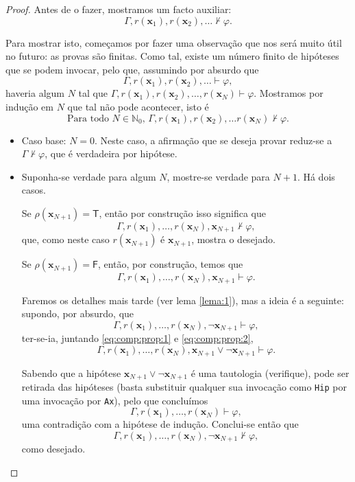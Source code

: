 \documentclass{report}
\theoremstyle{definition}
\theoremstyle{remark}
\newcommand{\N}{\mathbb{N}}
\renewcommand{\bf}[1]{\mathbf{#1}}
\newcommand{\lt}{\mathsf{T}}
\newcommand{\lf}{\mathsf{F}}
\begin{document}
\begin{proof}
	Antes de o fazer, mostramos um facto auxiliar:
	\begin{equation}\label{eq:comp:prop:-1}
	\Gamma, r(\bf x_1), r(\bf x_2), \dots \nvdash \varphi.
	\end{equation}
	
	Para mostrar isto, começamos por fazer uma observação que nos será muito útil no futuro: as provas são finitas. Como tal, existe um número finito de hipóteses que se podem invocar, pelo que, assumindo por absurdo que
	\[\Gamma, r(\bf x_1), r(\bf x_2), \dots \vdash \varphi,\]
	haveria algum $N$ tal que $\Gamma, r(\bf x_1), r(\bf x_2), \dots, r(\bf x_N) \vdash \varphi$. Mostramos por indução em $N$ que tal não pode acontecer, isto é
	\begin{equation}\label{eq:comp:prop:0}
	\text{Para todo $N \in \N_0$, } \Gamma, r(\bf x_1), r(\bf x_2), \dots r(\bf x_N) \nvdash \varphi.
	\end{equation}
	
	\begin{itemize}
	\item Caso base: $N = 0$. Neste caso, a afirmação que se deseja provar reduz-se a $\Gamma \nvdash \varphi$, que é verdadeira por hipótese.
	
	\item Suponha-se verdade para algum $N$, mostre-se verdade para $N+1$. Há dois casos.
	
	Se $\rho(\bf x_{N+1}) = \lt$, então por construção isso significa que
	\[\Gamma, r(\bf x_1), \dots, r(\bf x_N), \bf x_{N+1} \nvdash \varphi,\]
	que, como neste caso $r(\bf x_{N+1})$ é $\bf x_{N+1}$, mostra o desejado.
	
	Se $\rho(\bf x_{N+1}) = \lf$, então, por construção, temos que
	\begin{equation}\label{eq:comp:prop:1}
	\Gamma, r(\bf x_1), \dots, r(\bf x_N), \bf x_{N+1} \vdash \varphi.
	\end{equation}
	
	Faremos os detalhes mais tarde (ver lema \ref{lema:1}), mas a ideia é a seguinte: supondo, por absurdo, que
	\begin{equation}\label{eq:comp:prop:2}
	\Gamma, r(\bf x_1), \dots, r(\bf x_N), \neg \bf x_{N+1} \vdash \varphi,
	\end{equation}
	ter-se-ia, juntando \eqref{eq:comp:prop:1} e \eqref{eq:comp:prop:2},
	\[\Gamma, r(\bf x_1), \dots, r(\bf x_N), \bf x_{N+1} \lor \neg \bf x_{N+1} \vdash \varphi.\]
	
	Sabendo que a hipótese $\bf x_{N+1} \lor \neg \bf x_{N+1}$ é uma tautologia (verifique), pode ser retirada das hipóteses (basta substituir qualquer sua invocação como \texttt{Hip} por uma invocação por \texttt{Ax}), pelo que concluímos
	\[\Gamma, r(\bf x_1), \dots, r(\bf x_N) \vdash \varphi,\]
	uma contradição com a hipótese de indução. Conclui-se então que
	\[\Gamma, r(\bf x_1), \dots, r(\bf x_N), \neg \bf x_{N+1} \nvdash \varphi,\]
	como desejado.
	\end{itemize}
	

\end{proof}
\end{document}
